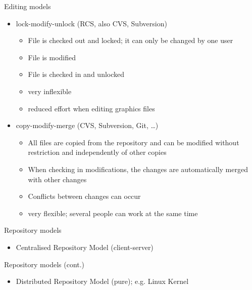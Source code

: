 \begin{frame}{Editing models}

\begin{itemize}
\item lock-modify-unlock  (RCS, also CVS, Subversion)
    \begin{itemize}
    \item File is checked out and locked; it can only be changed by one user
    \item File is modified
    \item File is checked in and unlocked
    \item {} very inflexible
    \item {} reduced effort when editing graphics files
    \end{itemize}
\item copy-modify-merge (CVS, Subversion, Git, \ldots)
    \begin{itemize}
    \item All files are copied from the repository and can be modified
        without restriction and independently of other copies
    \item When checking in modifications, the changes are automatically
        merged with other changes
    \item {} Conflicts between changes can occur
    \item {} very flexible; several people can work at the
        same time
    \end{itemize}
\end{itemize}

\end{frame}


\begin{frame}{Repository models}

\begin{itemize}
\item Centralised Repository Model (client-server)
\end{itemize}
\begin{center}
    \resizebox{!}{0.7\textheight}{
        
    }
\end{center}

\end{frame}

\begin{frame}{Repository models (cont.)}

\begin{itemize}
\item Distributed Repository Model (pure); e.g. Linux Kernel
\end{itemize}
\begin{center}
    \resizebox{!}{0.7\textheight}{
        
    }
\end{center}

\end{frame}


